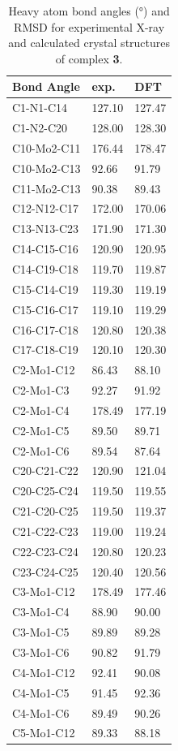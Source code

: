 \begin{longtable}{lll}
\caption{Heavy atom bond angles (°) and RMSD for experimental X-ray and calculated crystal structures of complex \textbf{3}.} \label{tab:angles3} \\
\textbf{Bond Angle} & \textbf{exp.} & \textbf{DFT} \\ \hline
C1-N1-C14 & 127.10 & 127.47 \\
C1-N2-C20 & 128.00 & 128.30 \\
C10-Mo2-C11 & 176.44 & 178.47 \\
C10-Mo2-C13 & 92.66 & 91.79 \\
C11-Mo2-C13 & 90.38 & 89.43 \\
C12-N12-C17 & 172.00 & 170.06 \\
C13-N13-C23 & 171.90 & 171.30 \\
C14-C15-C16 & 120.90 & 120.95 \\
C14-C19-C18 & 119.70 & 119.87 \\
C15-C14-C19 & 119.30 & 119.19 \\
C15-C16-C17 & 119.10 & 119.29 \\
C16-C17-C18 & 120.80 & 120.38 \\
C17-C18-C19 & 120.10 & 120.30 \\
C2-Mo1-C12 & 86.43 & 88.10 \\
C2-Mo1-C3 & 92.27 & 91.92 \\
C2-Mo1-C4 & 178.49 & 177.19 \\
C2-Mo1-C5 & 89.50 & 89.71 \\
C2-Mo1-C6 & 89.54 & 87.64 \\
C20-C21-C22 & 120.90 & 121.04 \\
C20-C25-C24 & 119.50 & 119.55 \\
C21-C20-C25 & 119.50 & 119.37 \\
C21-C22-C23 & 119.00 & 119.24 \\
C22-C23-C24 & 120.80 & 120.23 \\
C23-C24-C25 & 120.40 & 120.56 \\
C3-Mo1-C12 & 178.49 & 177.46 \\
C3-Mo1-C4 & 88.90 & 90.00 \\
C3-Mo1-C5 & 89.89 & 89.28 \\
C3-Mo1-C6 & 90.82 & 91.79 \\
C4-Mo1-C12 & 92.41 & 90.08 \\
C4-Mo1-C5 & 91.45 & 92.36 \\
C4-Mo1-C6 & 89.49 & 90.26 \\
C5-Mo1-C12 & 89.33 & 88.18 \\

\end{longtable}
